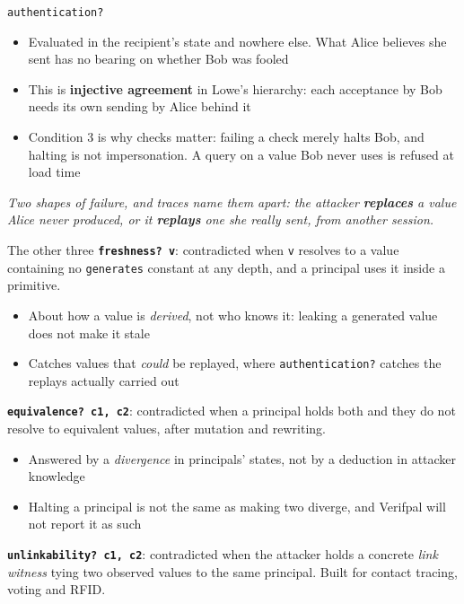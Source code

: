 \ifdefined\PRESENTATION\else\PassOptionsToClass{handout}{beamer}\fi\documentclass[aspectratio=169, lualatex]{beamer}
\begin{document}
\begin{frame}{\texttt{authentication?}}
	\vspace{0.1em}
	\small
	\begin{itemize}
		\item Evaluated in the recipient's state and nowhere else. What Alice believes she sent has no bearing on whether Bob was fooled
		\item This is \textbf{injective agreement} in Lowe's hierarchy: each acceptance by Bob needs its own sending by Alice behind it
		\item Condition 3 is why checks matter: failing a check merely halts Bob, and halting is not impersonation. A query on a value Bob never uses is refused at load time
	\end{itemize}
	\begin{center}
		\footnotesize
		\textit{Two shapes of failure, and traces name them apart: the attacker \textbf{replaces} a value Alice never produced, or it \textbf{replays} one she really sent, from another session.}
	\end{center}
\end{frame}

\begin{frame}{The other three}
	\small
	\textbf{\texttt{freshness? v}}: contradicted when \texttt{v} resolves to a value containing no \texttt{generates} constant at any depth, and a principal uses it inside a primitive.
	\begin{itemize}
		\item About how a value is \textit{derived}, not who knows it: leaking a generated value does not make it stale
		\item Catches values that \textit{could} be replayed, where \texttt{authentication?} catches the replays actually carried out
	\end{itemize}
	\vspace{0.3em}
	\textbf{\texttt{equivalence? c1, c2}}: contradicted when a principal holds both and they do not resolve to equivalent values, after mutation and rewriting.
	\begin{itemize}
		\item Answered by a \textit{divergence} in principals' states, not by a deduction in attacker knowledge
		\item Halting a principal is not the same as making two diverge, and Verifpal will not report it as such
	\end{itemize}
	\vspace{0.3em}
	\textbf{\texttt{unlinkability? c1, c2}}: contradicted when the attacker holds a concrete \textit{link witness} tying two observed values to the same principal. Built for contact tracing, voting and RFID.
\end{frame}
\end{document}
